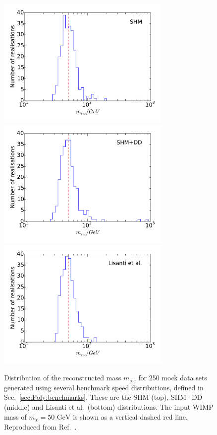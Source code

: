 \begin{figure}
\centering
  \includegraphics[trim=0cm 1cm 0cm 0.5cm,clip=true,width=0.75\textwidth]{Poly/SHM_ensemble.pdf}
  \includegraphics[trim=0cm 1cm 0cm 0.5cm,clip=true,width=0.75\textwidth]{Poly/DD_ensemble.pdf}
  \includegraphics[trim=0cm 1cm 0cm 0.5cm,clip=true,width=0.75\textwidth]{Poly/LIS_ensemble.pdf}
  \caption[Distribution of the reconstructed mass using a 50 GeV WIMP and SHM, SHM+DD and Lisanti et al. distribution functions]{Distribution of the reconstructed mass $m_\textrm{rec}$ for 250 mock data sets generated using several benchmark speed distributions, defined in Sec.~\ref{sec:Poly:benchmarks}. These are the SHM (top), SHM+DD (middle) and Lisanti et al.\ (bottom) distributions. The input WIMP mass of $m_\chi = 50 \textrm{ GeV}$ is shown as a vertical dashed red line. Reproduced from Ref.~\cite{Kavanagh:2014}.} 
  \label{fig:Poly:Realisations}
\end{figure}


